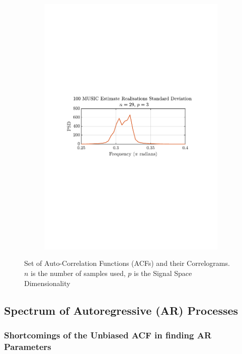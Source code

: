 \documentclass[12pt]{article}
\begin{document}
\begin{figure}[H]
\begin{subfigure}{0.49\textwidth}
			\includegraphics[trim={2.2cm 11.2cm 3.15cm  11.2cm}, clip, width=\textwidth]{../MATLAB/figures/q1_3e_fig06.pdf} 
		\end{subfigure}
		\captionsetup{justification=centering}
		\caption{Set of Auto-Correlation Functions (ACFs) and their Correlograms. \\ $n$ is the number of samples used, $p$ is the Signal Space Dimensionality}
		\label{fig: 1-3e}
	\end{figure}


	
	\subsection{Spectrum of Autoregressive (AR) Processes} \label{sec: 1-4-spectrums-AR}

	
	\subsubsection{Shortcomings of the Unbiased ACF in finding AR Parameters}
	
\end{document}
